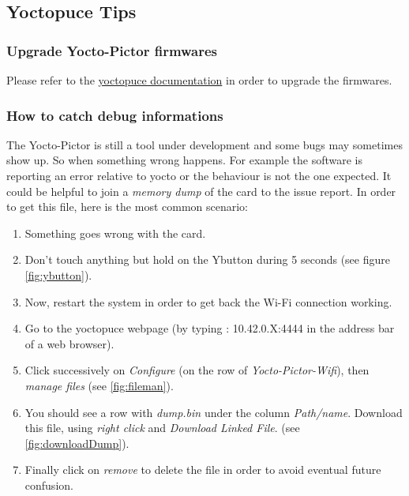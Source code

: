 \subsection{Yoctopuce Tips}

\subsubsection{Upgrade Yocto-Pictor firmwares}
\label{annex:yoctoUpdate} 

Please refer to the
\href{https://www.yoctopuce.com/EN/products/virtualhub/doc/VIRTHUB0.usermanual.html#CHAP3SEC4}
{yoctopuce documentation} in order to upgrade the firmwares.

\subsubsection{How to catch debug informations}

The Yocto-Pictor is still a tool under development and some bugs may
sometimes show up. So when something wrong happens. For example the software is 
reporting an error relative to yocto or the behaviour is not the one expected. 
It could be helpful to join a \emph{memory dump} of the card to the issue
report. In order to get this file, here is the most common scenario:

\begin{enumerate}
	\item Something goes wrong with the card.

	\item Don't touch anything but hold on the Ybutton during 5 seconds 
		(see figure \ref{fig:ybutton}).

	\item Now, restart the system in order to get back the Wi-Fi connection 
		working.

	\item Go to the yoctopuce webpage (by typing : 10.42.0.X:4444 in the
		address bar of a web browser).

	\item Click successively on \emph{Configure} (on the row of
		\emph{Yocto-Pictor-Wifi}), then \emph{manage files} 
		(see \ref{fig:fileman}).

	\item You should see a row with \emph{dump.bin} under the column
		\emph{Path/name}.
		Download this file, using \emph{right click} and \emph{Download
		Linked File}.
		(see \ref{fig:downloadDump}).

	\item Finally click on \emph{remove} to delete the file in order to avoid
		eventual future confusion.
\end{enumerate}

